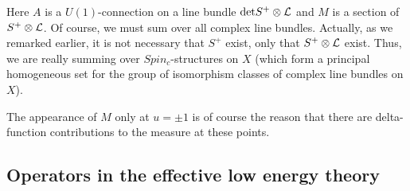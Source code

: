 \documentclass[10pt]{article}
\begin{document}
Here $A$ is a $U(1)$-connection on a line bundle ${\rm det}{S^+\otimes
\cal L}$ and $M$ is 
a section of $S^+\otimes {\cal L}$.
Of course, we must sum over all complex line bundles.
Actually, as we remarked earlier, it is not necessary that $S^+$
exist, only that $S^+\otimes {\cal L}$ exist.  Thus, we are really
summing over $Spin_c$-structures on $X$ (which form a principal
homogeneous set for the group of isomorphism classes of complex line
bundles on $X$).

The appearance of $M$ only at $u=\pm 1$ is of course the reason that
there are delta-function contributions to the measure at these points. 









\subsection{Operators in the effective low energy theory}
\end{document}
